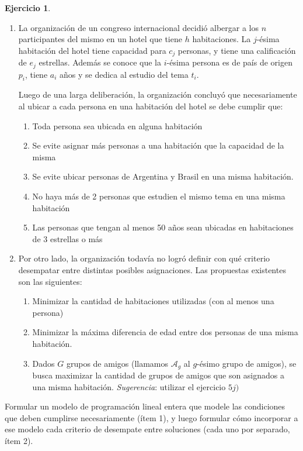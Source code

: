 \documentclass[12pt]{article}
\theoremstyle{definition}
\newtheorem{ejer}{Ejercicio}
\newcommand{\bej}{\begin{ejer}}
\newcommand{\fej}{\end{ejer}}
\begin{document}
\bej
    \begin{enumerate}
        \item 	La organización de un congreso internacional decidió albergar a los $n$ participantes del mismo en un hotel que tiene $h$ habitaciones. La $j$-ésima habitación del hotel tiene capacidad para $c_j$ personas, y tiene una calificación de $e_j$ estrellas. Además se conoce que la $i$-ésima persona es de país de origen $p_i$, tiene $a_i$ años y se dedica al estudio del tema $t_i$.
	
	Luego de una larga deliberación, la organización concluyó que necesariamente al ubicar a cada persona en una habitación del hotel se debe cumplir que:
	\begin{enumerate}
		\item Toda persona sea ubicada en alguna habitación
		\item Se evite asignar más personas a una habitación que la capacidad de la misma
		\item Se evite ubicar personas de Argentina y Brasil en una misma habitación.
		\item No haya más de 2 personas que estudien el mismo tema en una misma habitación
		\item Las personas que tengan al menos 50 años sean ubicadas en habitaciones de 3 estrellas o más
	\end{enumerate}
	\item Por otro lado, la organización todavía no logró definir con qué criterio desempatar entre distintas posibles asignaciones. Las propuestas existentes son las siguientes:
	\begin{enumerate}
		\item Minimizar la cantidad de habitaciones utilizadas (con al menos una persona)
		\item Minimizar la máxima diferencia de edad entre dos personas de una misma habitación.
		\item Dados $G$ grupos de amigos (llamamos $\mathcal{A}_g$ al $g$-ésimo grupo de amigos), se busca maximizar la cantidad de grupos de amigos que son asignados a una misma habitación.
		\textit{Sugerencia}: utilizar el ejercicio $5j)$
    \end{enumerate}
	\end{enumerate}
	Formular un modelo de programación lineal entera que modele las condiciones que deben cumplirse necesariamente (ítem 1), y luego formular cómo incorporar a ese modelo cada criterio de desempate entre soluciones (cada uno por separado, ítem 2).
\fej
\end{document}
